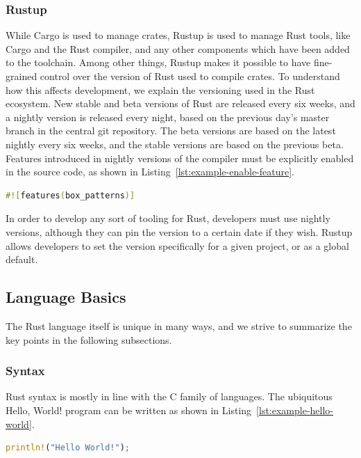 \documentclass{article}
\begin{document}
\subsubsection{Rustup}
While Cargo is used to manage crates, Rustup is used to manage Rust tools, like Cargo and the Rust compiler, and any other components which have been added to the toolchain. Among other things, Rustup makes it possible to have fine-grained control over the version of Rust used to compile crates. To understand how this affects development, we explain the versioning used in the Rust ecosystem. New stable and beta versions of Rust are released every six weeks, and a nightly version is released every night, based on the previous day’s master branch in the central git repository. The beta versions are based on the latest nightly every six weeks, and the stable versions are based on the previous beta.
Features introduced in nightly versions of the compiler must be explicitly enabled in the source code, as shown in Listing~\ref{lst:example-enable-feature}.

\begin{lstlisting}[language=Rust, style=boxed, caption=Enabling features in Rust, label=lst:example-enable-feature]
#![features(box_patterns)]
\end{lstlisting}

In order to develop any sort of tooling for Rust, developers must use nightly versions, although they can pin the version to a certain date if they wish.
Rustup allows developers to set the version specifically for a given project, or as a global default.

\subsection{Language Basics}
The Rust language itself is unique in many ways, and we strive to summarize the key points in the following subsections.

\subsubsection{Syntax}
Rust syntax is mostly in line with the C family of languages. The ubiquitous Hello, World! program can be written as shown in Listing~\ref{lst:example-hello-world}.
\begin{lstlisting}[language=Rust, style=boxed, caption=Hello World, label=lst:example-hello-world]
println!("Hello World!");
\end{lstlisting}
\end{document}
